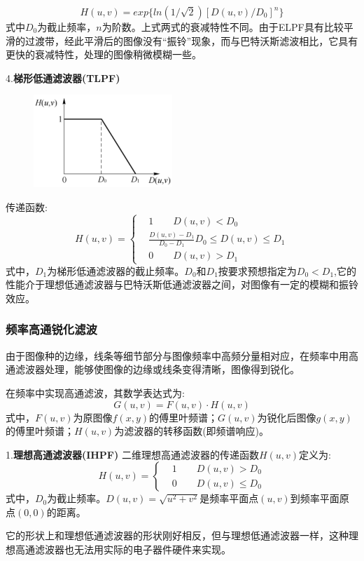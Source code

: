 \documentclass[11pt]{article}
\begin{document}
$$H(u,v) = exp\{ln(1/\sqrt{2})[D(u,v)/D_0]^n\}$$
式中$D_0$为截止频率，$n$为阶数。上式两式的衰减特性不同。由于ELPF具有比较平滑的过渡带，经此平滑后的图像没有“振铃”现象，而与巴特沃斯滤波相比，它具有更快的衰减特性，处理的图像稍微模糊一些。

4.\textbf{梯形低通滤波器(TLPF)}

\begin{figure}
	\centering
	\includegraphics[width=0.23\textheight]{34}
\end{figure}
传递函数:
$$H(u,v) = \left\{\begin{matrix}
	&1 \qquad D(u,v)< D_0\\ 
	&\frac{D(u,v)-D_1}{D_0-D_1} D_0\leq D(u,v)\leq D_1 \\
	&0 \qquad D(u,v)> D_1
\end{matrix}\right.$$
式中，$D_1$为梯形低通滤波器的截止频率。$D_0$和$D_1$按要求预想指定为$D_0<D_1$,它的性能介于理想低通滤波器与巴特沃斯低通滤波器之间，对图像有一定的模糊和振铃效应。

\subsubsection{频率高通锐化滤波}
由于图像种的边缘，线条等细节部分与图像频率中高频分量相对应，在频率中用高通滤波器处理，能够使图像的边缘或线条变得清晰，图像得到锐化。

在频率中实现高通滤波，其数学表达式为:
$$G(u,v) = F(u,v) \cdot H(u,v)$$
式中，$F(u,v)$为原图像$f(x,y)$的傅里叶频谱；$G(u,v)$为锐化后图像$g(x,y)$的傅里叶频谱；$H(u,v)$为滤波器的转移函数(即频谱响应)。

1.\textbf{理想高通滤波器(IHPF)}
二维理想高通滤波器的传递函数$H(u,v)$定义为:
$$H(u,v) = \left\{\begin{matrix}
	&1 \qquad D(u,v)>D_0\\
	&0 \qquad D(u,v)\leq D_0
\end{matrix}\right.$$
式中，$D_0$为截止频率。$D(u,v)=\sqrt{u^2+v^2}$是频率平面点$(u,v)$到频率平面原点$(0,0)$的距离。

它的形状上和理想低通滤波器的形状刚好相反，但与理想低通滤波器一样，这种理想高通滤波器也无法用实际的电子器件硬件来实现。
\end{document}
